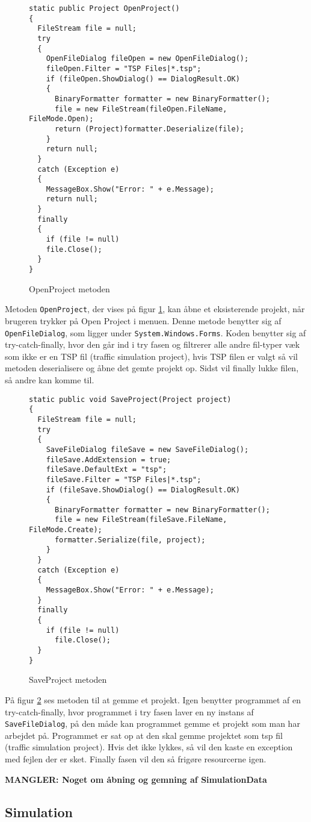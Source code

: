 \begin{figure}[H]
\begin{lstlisting}
static public Project OpenProject()
{
  FileStream file = null;
  try
  {
    OpenFileDialog fileOpen = new OpenFileDialog();
    fileOpen.Filter = "TSP Files|*.tsp";
    if (fileOpen.ShowDialog() == DialogResult.OK)
    {
      BinaryFormatter formatter = new BinaryFormatter();
      file = new FileStream(fileOpen.FileName, FileMode.Open);
      return (Project)formatter.Deserialize(file);
    }
    return null;
  }
  catch (Exception e)
  {
    MessageBox.Show("Error: " + e.Message);
    return null;
  }
  finally
  {
    if (file != null)
    file.Close();
  }
}
\end{lstlisting}
\caption{OpenProject metoden}\label{OpenProjectCode}
\end{figure}

Metoden \texttt{OpenProject}, der vises på figur \ref{OpenProjectCode}, kan åbne et eksisterende projekt, når brugeren trykker på Open Project i menuen. Denne metode benytter sig af \texttt{OpenFileDialog}, som ligger under \texttt{System.Windows.Forms}. Koden benytter sig af try-catch-finally, hvor den går ind i try fasen og filtrerer alle andre fil-typer væk som ikke er en TSP fil (traffic simulation project), hvis TSP filen er valgt så vil metoden deserialisere og åbne det gemte projekt op. Sidst vil finally lukke filen, så andre kan komme til.

\begin{figure}[H]
\begin{lstlisting}
static public void SaveProject(Project project)
{ 
  FileStream file = null;
  try
  {
    SaveFileDialog fileSave = new SaveFileDialog();
    fileSave.AddExtension = true;
    fileSave.DefaultExt = "tsp";
    fileSave.Filter = "TSP Files|*.tsp";
    if (fileSave.ShowDialog() == DialogResult.OK)
    {
      BinaryFormatter formatter = new BinaryFormatter();
      file = new FileStream(fileSave.FileName, FileMode.Create);
      formatter.Serialize(file, project);
    }
  }
  catch (Exception e)
  {
    MessageBox.Show("Error: " + e.Message);
  }
  finally
  {
    if (file != null)
      file.Close();
  }
}
\end{lstlisting}
\caption{SaveProject metoden}\label{SaveProjectCode}
\end{figure}

På figur \ref{SaveProjectCode} ses metoden til at gemme et projekt. Igen benytter programmet af en try-catch-finally, hvor programmet i try fasen laver en ny instans af \texttt{SaveFileDialog}, på den måde kan programmet gemme et projekt som man har arbejdet på. Programmet er sat op at den skal gemme projektet som tsp fil (traffic simulation project). Hvis det ikke lykkes, så vil den kaste en exception med fejlen der er sket. Finally fasen vil den så frigøre resourcerne igen.

\vspace{5mm}

\textbf{MANGLER: Noget om åbning og gemning af SimulationData}

\subsection{Simulation}\label{SimulationClass}